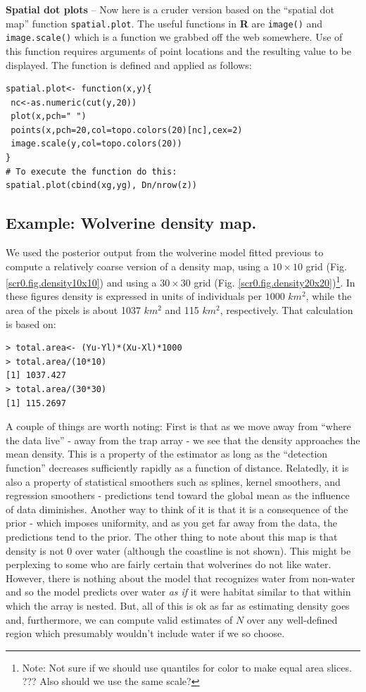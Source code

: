 {\bf Spatial dot plots } -- Now here is a cruder version based on the
``spatial dot map'' function \mbox{\tt spatial.plot}.  The useful
functions in {\bf R}
are \mbox{\tt image()} and \mbox{\tt image.scale()} which is a function we grabbed off 
the web somewhere. Use of this function requires arguments of point
locations and the resulting value to be displayed. The function is
defined and applied as follows:
\begin{verbatim}
spatial.plot<- function(x,y){
 nc<-as.numeric(cut(y,20))
 plot(x,pch=" ")
 points(x,pch=20,col=topo.colors(20)[nc],cex=2)
 image.scale(y,col=topo.colors(20))
}
# To execute the function do this:
spatial.plot(cbind(xg,yg), Dn/nrow(z))
\end{verbatim}

\subsection{Example: Wolverine density map. } 


We used the posterior output from the wolverine model fitted previous
to compute a relatively coarse version of a density map, using a $10 \times
10$ grid (Fig. \ref{scr0.fig.density10x10}) and using a $30 \times 30$
grid (Fig. \ref{scr0.fig.density20x20})\footnote{Note: Not sure if we
  should use quantiles for color to make equal area slices. ??? Also
  should we use the same scale?}. In these figures density is
expressed in units of individuals per $1000$ $km^2$, while the area of
the pixels is about 1037 $km^2$ and 115 $km^2$, respectively. That
calculation is based on:
\begin{verbatim}
> total.area<- (Yu-Yl)*(Xu-Xl)*1000
> total.area/(10*10)
[1] 1037.427
> total.area/(30*30)
[1] 115.2697
\end{verbatim}

A couple of things are worth noting: First is that as we move away
from ``where the data live'' - away from the trap array - we see that
the density approaches the mean density. This is a property of the
estimator as long as the ``detection function'' decreases sufficiently
rapidly as a function of distance. 
Relatedly, it is also a property of statistical smoothers
such as splines, kernel smoothers, and regression smoothers -
predictions tend toward the global mean as the influence of data
diminishes. Another way to think of it is that it is a consequence of
the prior - which imposes uniformity, and as you get far away from the
data, the predictions tend to the prior. The other thing to note about
this map is that density is not $0$ over water (although the coastline
is not shown). This might be perplexing
to some who are fairly certain that wolverines do not like
water. However, there is nothing about the model that recognizes water
from non-water and so the model predicts over water {\it as if} it
were habitat similar to that within which the array is nested. But,
all of this is ok as far as estimating density goes and, furthermore,
we can compute valid estimates of $N$ over any well-defined region which
presumably wouldn't include water if we so choose.

